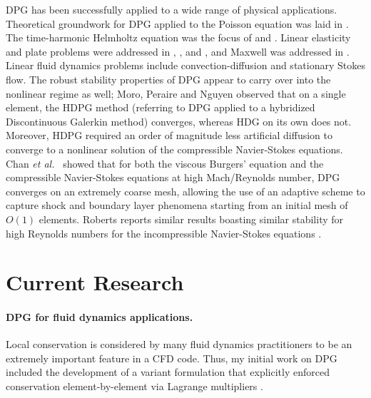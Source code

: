 \documentclass[letterpaper,12pt]{article}
\def\etal{{\it et al.~}}
\begin{document}
DPG has been successfully applied to a wide range of physical applications.  
Theoretical groundwork for DPG applied to the Poisson equation was laid in \cite{DPGPoisson}.  The time-harmonic Helmholtz equation was the focus of \cite{DPGHelmholtz, Gopalakrishnan2014} and \cite{DPG4}.  Linear elasticity and plate problems were addressed in \cite{BramwellDPG}, \cite{NiemiBramwellDemkowicz10}, and \cite{BramwellDemkowiczQiu10}, and Maxwell was addressed in \cite{DPGCloaking, WohlmuthReport}.  Linear fluid dynamics problems include convection-diffusion \cite{DPG3,DemkowiczHeuer,ChanHeuerThanhDemkowicz2012,Chan2013,EllisLC} and stationary Stokes flow\cite{DPGStokes,EllisLC}.
The robust stability properties of DPG appear to carry over into the nonlinear regime as well; Moro, Peraire and Nguyen observed \cite{MoroNguyenPeraire11, MoroMastersThesis} that on a single element, the HDPG method (referring to DPG applied to a hybridized Discontinuous Galerkin method) converges, whereas HDG on its own does not.  Moreover, HDPG required an order of magnitude less artificial diffusion to converge to a nonlinear solution of the compressible Navier-Stokes equations.  Chan \etal \cite{Chan2013dpg} showed that for both the viscous Burgers' equation and the compressible Navier-Stokes equations at high Mach/Reynolds number, DPG converges on an extremely coarse mesh, allowing the use of an adaptive scheme to capture shock and boundary layer phenomena starting from an initial mesh of $O(1)$ elements.  Roberts reports similar results boasting similar stability for high Reynolds numbers for the incompressible Navier-Stokes equations \cite{NateDissertation}.  

\section*{Current Research}
\paragraph{DPG for fluid dynamics applications.}
Local conservation is considered by many fluid dynamics practitioners to be an extremely important feature in a CFD code. 
Thus, my initial work on DPG included the development of a variant formulation that explicitly enforced conservation element-by-element 
via Lagrange multipliers \cite{EllisLC}.
\end{document}
